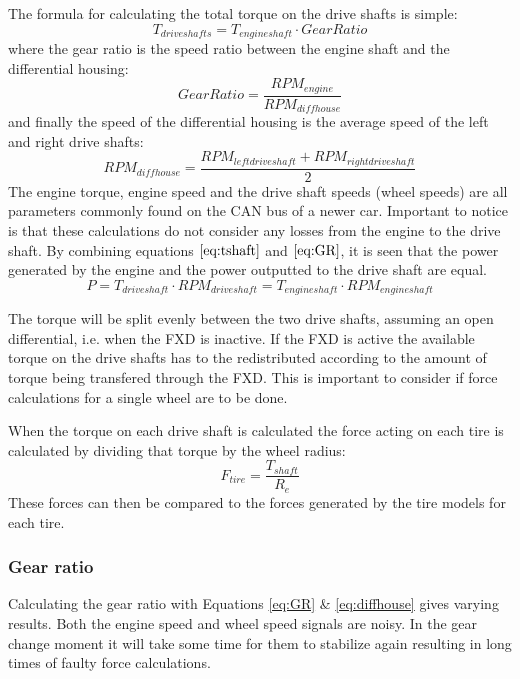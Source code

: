 The formula for calculating the total torque on the drive shafts is simple:
\begin{equation}
\label{eq:tshaft}
T_{driveshafts} = T_{engineshaft}\cdot GearRatio
\end{equation}
where the gear ratio is the speed ratio between the engine shaft and the differential housing:
\begin{equation}
\label{eq:GR}
Gear Ratio = \frac{RPM_{engine}}{RPM_{diffhouse}}
\end{equation}
and finally the speed of the differential housing is the average speed of the left and right drive shafts:
\begin{equation}
\label{eq:diffhouse}
RPM_{diffhouse} = \frac{RPM_{leftdriveshaft}+RPM_{rightdriveshaft}}{2}
\end{equation}
The engine torque, engine speed and the drive shaft speeds (wheel speeds) are all parameters commonly found on the CAN bus of a newer car. Important to notice is that these calculations do not consider any losses from the engine to the drive shaft. By combining equations $ \ref{eq:tshaft} $ and $ \ref{eq:GR} $, it is seen that the power generated by the engine and the power outputted to the drive shaft are equal.
\begin{equation}
P = T_{driveshaft}\cdot RPM_{driveshaft} = T_{engineshaft}\cdot RPM_{engineshaft}
\end{equation}

The torque will be split evenly between the two drive shafts, assuming an open differential, i.e. when the FXD is inactive. If the FXD is active the available torque on the drive shafts has to the redistributed according to the amount of torque being transfered through the FXD. This is important to consider if force calculations for a single wheel are to be done. 

When the torque on each drive shaft is calculated the force acting on each tire is calculated by dividing that torque by the wheel radius:
\begin{equation}
\label{eq:tireforce}
F_{tire} = \frac{T_{shaft}}{R_{e}}
\end{equation}
These forces can then be compared to the forces generated by the tire models for each tire.

\subsubsection{Gear ratio}
Calculating the gear ratio with Equations \ref{eq:GR} \& \ref{eq:diffhouse} gives varying results. Both the engine speed and wheel speed signals are noisy. In the gear change moment it will take some time for them to stabilize again resulting in long times of faulty force calculations. 

